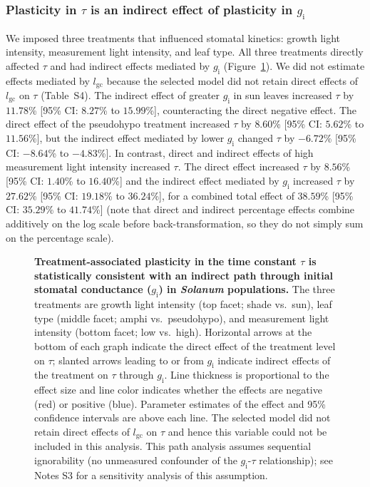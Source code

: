 \documentclass[
  letterpaper,
  DIV=11,
  numbers=noendperiod]{scrartcl}
\newcommand{\gcl}{$l_\mathrm{gc}$}
\newcommand{\gi}{$g_\mathrm{i}$}
\begin{document}
\subsubsection{\texorpdfstring{Plasticity in \(\tau\) is an indirect
effect of plasticity in
\gi}{Plasticity in \textbackslash tau is an indirect effect of plasticity in }}\label{plasticity-in-tau-is-an-indirect-effect-of-plasticity-in}

We imposed three treatments that influenced stomatal kinetics: growth
light intensity, measurement light intensity, and leaf type. All three
treatments directly affected \(\tau\) and had indirect effects mediated
by \gi{} (Figure~\ref{fig-mediation}). We did not estimate effects
mediated by \gcl{} because the selected model did not retain direct
effects of \gcl{} on \(\tau\) (Table~S4). The indirect
effect of greater \gi{} in sun leaves increased \(\tau\) by \(11.78\)\%
{[}95\% CI: \(8.27\)\% to \(15.99\)\%{]}, counteracting the direct
negative effect. The direct effect of the pseudohypo treatment increased
\(\tau\) by \(8.60\)\% {[}95\% CI: \(5.62\)\% to \(11.56\)\%{]}, but the
indirect effect mediated by lower \gi{} changed \(\tau\) by \(-6.72\)\%
{[}95\% CI: \(-8.64\)\% to \(-4.83\)\%{]}. In contrast, direct and
indirect effects of high measurement light intensity increased \(\tau\).
The direct effect increased \(\tau\) by \(8.56\)\% {[}95\% CI:
\(1.40\)\% to \(16.40\)\%{]} and the indirect effect mediated by \gi{}
increased \(\tau\) by \(27.62\)\% {[}95\% CI: \(19.18\)\% to
\(36.24\)\%{]}, for a combined total effect of \(38.59\)\% {[}95\% CI:
\(35.29\)\% to \(41.74\)\%{]} (note that direct and indirect percentage
effects combine additively on the log scale before back-transformation,
so they do not simply sum on the percentage scale).

\begin{figure}


\caption{\label{fig-mediation}\textbf{Treatment-associated plasticity in the time constant $\tau$ is statistically consistent with an indirect path through initial stomatal conductance (\gi) in \textit{Solanum} populations.}
The three treatments are growth light intensity (top facet; shade
vs.~sun), leaf type (middle facet; amphi vs.~pseudohypo), and
measurement light intensity (bottom facet; low vs.~high). Horizontal
arrows at the bottom of each graph indicate the direct effect of the
treatment level on \(\tau\); slanted arrows leading to or from \gi{}
indicate indirect effects of the treatment on \(\tau\) through \gi{}.
Line thickness is proportional to the effect size and line color
indicates whether the effects are negative (red) or positive (blue).
Parameter estimates of the effect and 95\% confidence intervals are
above each line. The selected model did not retain direct effects of
\gcl{} on \(\tau\) and hence this variable could not be included in this
analysis. This path analysis assumes sequential ignorability (no
unmeasured confounder of the \gi{}-\(\tau\) relationship); see Notes S3
for a sensitivity analysis of this assumption.}

\end{figure}%
\end{document}
